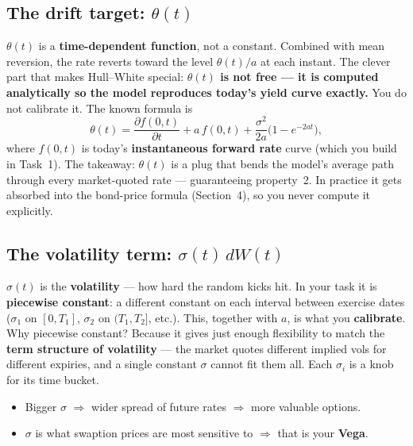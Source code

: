 \documentclass[11pt]{article}
\begin{document}
\subsection{The drift target: $\theta(t)$}
$\theta(t)$ is a \textbf{time-dependent function}, not a constant. Combined with mean
reversion, the rate reverts toward the level $\theta(t)/a$ at each instant. The clever
part that makes Hull--White special: \textbf{$\theta(t)$ is not free --- it is computed
analytically so the model reproduces today's yield curve exactly.} You do not calibrate
it. The known formula is
\[
  \theta(t) = \frac{\partial f(0,t)}{\partial t} + a\,f(0,t)
              + \frac{\sigma^2}{2a}\big(1 - e^{-2at}\big),
\]
where $f(0,t)$ is today's \textbf{instantaneous forward rate} curve (which you build in
Task~1). The takeaway: $\theta(t)$ is a plug that bends the model's average path through
every market-quoted rate --- guaranteeing property~2. In practice it gets absorbed into
the bond-price formula (Section~4), so you never compute it explicitly.

\subsection{The volatility term: $\sigma(t)\,dW(t)$}
$\sigma(t)$ is the \textbf{volatility} --- how hard the random kicks hit. In your task it
is \textbf{piecewise constant}: a different constant on each interval between exercise
dates ($\sigma_1$ on $[0,T_1]$, $\sigma_2$ on $(T_1,T_2]$, etc.). This, together with
$a$, is what you \textbf{calibrate}. Why piecewise constant? Because it gives just enough
flexibility to match the \textbf{term structure of volatility} --- the market quotes
different implied vols for different expiries, and a single constant $\sigma$ cannot fit
them all. Each $\sigma_i$ is a knob for its time bucket.
\begin{itemize}[leftmargin=1.4em]
  \item Bigger $\sigma$ $\Rightarrow$ wider spread of future rates $\Rightarrow$ more
        valuable options.
  \item $\sigma$ is what swaption prices are most sensitive to $\Rightarrow$ that is your
        \textbf{Vega}.
\end{itemize}
\end{document}
